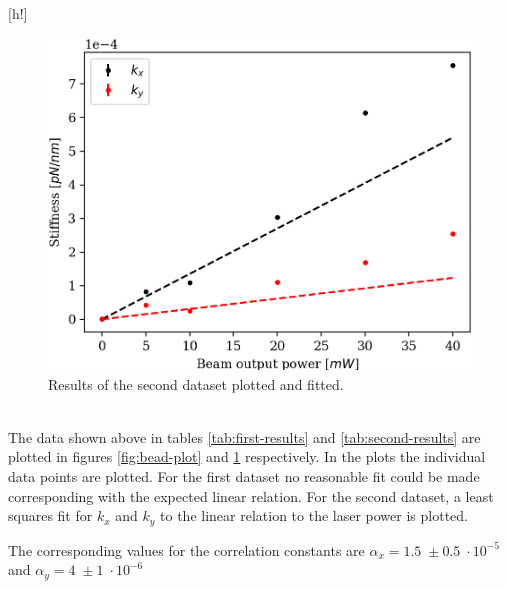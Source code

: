 \begin{minipage}{\linewidth}[h!]
\begin{minipage}[r]{0.45\linewidth}
\begin{figure}[H]
            \includegraphics[width=\linewidth]{figures/trap.png}
            \caption{Results of the second dataset plotted and fitted.\\}
            \label{fig:trap-plot}
        \end{figure}
    \end{minipage}

\end{minipage}
\\

The data shown above in tables \ref{tab:first-results} and \ref{tab:second-results} are plotted in figures \ref{fig:bead-plot} and \ref{fig:trap-plot} re\-spectively. In the plots the in\-divi\-dual data points are plotted. For the first dataset no reasonable fit could be made corresponding with the expected linear relation. For the second dataset, a least squares fit for $k_x$ and $k_y$ to the linear relation to the laser power is plotted.

The corresponding values for the correlation constants are $ \alpha_x = 1.5 \; \pm 0.5 \; \cdot 10^{-5}$ and $\alpha_y = 4 \; \pm 1 \; \cdot 10^{-6}$

